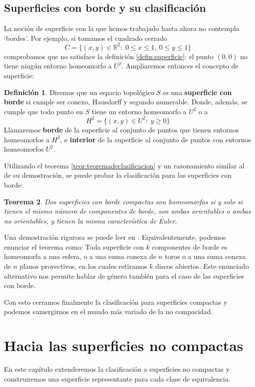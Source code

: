 \documentclass[a4paper,11pt,spanish, twoside, leqno]{tfg-uam}
\newcommand*{\reales}{\mathbb{R}}
\newtheorem{teor}{Teorema}[chapter]
\theoremstyle{definition}
\newtheorem{defin}[teor]{Definici\'on}
\begin{document}
\section{Superficies con borde y su clasificación}
\label{sec:superfborde}
La noción de superficie con la que hemos trabajado hasta ahora no contempla `bordes'. Por ejemplo, si tomamos el cuadrado cerrado
\[
C = \{(x,y)\in \reales^2:\; 0 \leq x \leq 1, \: 0 \leq y \leq 1  \}
\]
comprobamos que no satisface la definición \ref{defin:superficie}: el punto $(0,0)$ no tiene ningún entorno homeomorfo a $U^2$. Ampliaremos entonces el concepto de superficie:

\begin{defin}
Diremos que un espacio topológico $S$ es una \textbf{superficie con borde} si cumple ser conexo, Hausdorff y segundo numerable. Donde, además, se cumple que todo punto en $S$ tiene un entorno homeomorfo a $U^2$ o a
\[H^2 = \{(x,y)\in U^2:\; y\geq0 \}\]
Llamaremos \textbf{borde} de la superficie al conjunto de puntos que tienen entornos homeomorfos a $H^2$, e \textbf{interior} de la superficie al conjunto de puntos con entornos homeomorfos $U^2$.
\end{defin}

Utilizando el teorema \ref{teor:teoremadeclasificacion} y un razonamiento similar al de su demostración, se puede probar la clasificación para las superficies con borde:

\begin{teor}
Dos superficies con borde compactas son homeomorfas si y solo si tienen el mismo número de componentes de borde, son ambas orientables o ambas no orientables, y tienen la misma característica de Euler.
\end{teor}

Una demostración rigurosa se puede leer en \cite{massey}. Equivalentemente, podemos enunciar el teorema como: Toda superficie con $k$ componentes de borde es homeomorfa a una esfera, o a una suma conexa de $n$ toros o a una suma conexa de $n$ planos proyectivos, en los cuales retiramos $k$ discos abiertos. Este enunciado alternativo nos permite hablar de género también para el caso de las superficies con borde. 

Con esto cerramos finalmente la clasificación para superficies compactas y  podemos sumergirnos en el mundo más variado de la no compacidad.



\chapter{Hacia las superficies no compactas}
En este capítulo extenderemos la clasificación a superficies no compactas y construiremos una superficie representante para cada clase de equivalencia.
\end{document}
